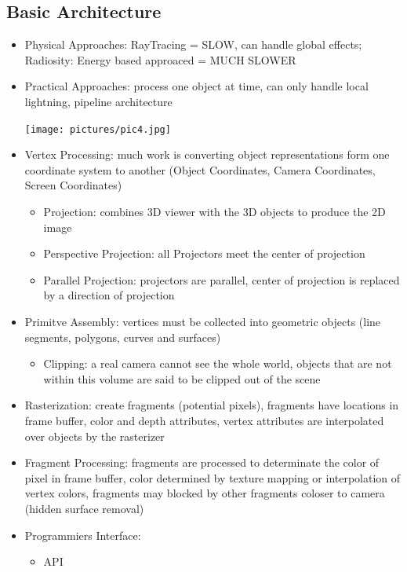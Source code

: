 \documentclass[11pt,a4paper]{article}
\begin{document}
	\subsection{Basic Architecture} 
		\begin{itemize}
			\item Physical Approaches: RayTracing = SLOW, can handle global effects; Radiosity: Energy based approaced = MUCH SLOWER
			\item Practical Approaches: process one object at time, can only handle local lightning, pipeline architecture
			\begin{center}
				\texttt{[image: pictures/pic4.jpg]}
			\end{center}
			\item Vertex Processing: much work is converting object representations form one coordinate system to another (Object Coordinates, Camera Coordinates, Screen Coordinates)
			\begin{itemize}
				\item Projection: combines 3D viewer with the 3D objects to produce the 2D image
				\item Perspective Projection: all Projectors meet the center of projection
				\item Parallel Projection: projectors are parallel, center of projection is replaced by a direction of projection
			\end{itemize}
			\item Primitve Assembly: vertices must be collected into geometric objects (line segments, polygons, curves and surfaces)
			\begin{itemize}
				\item Clipping: a real camera cannot see the whole world, objects that are not within this volume are said to be clipped out of the scene
			\end{itemize}
			\item Rasterization: create fragments (potential pixels), fragments have locations in frame buffer, color and depth attributes, vertex attributes are interpolated over objects by the rasterizer
			\item Fragment Processing: fragments are processed to determinate the color of pixel in frame buffer, color determined by texture mapping or interpolation of vertex colors, fragments may blocked by other fragments coloser to camera (hidden surface removal)
			\item Programmiers Interface:
			\begin{itemize}
				\item API

\end{itemize}
\end{itemize}
\end{document}
